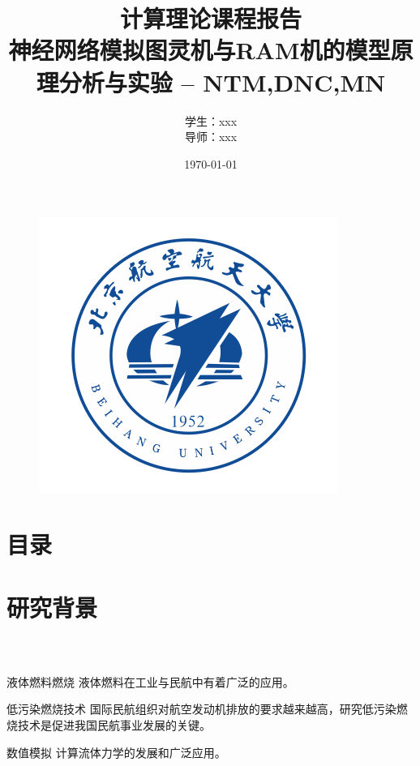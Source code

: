 \documentclass[compress]{beamer}%
\begin{document}
\graphicspath{{figures/}} %
\captionsetup[figure]{font=footnotesize,labelfont=footnotesize}

\title{计算理论课程报告 \\ 神经网络模拟图灵机与RAM机的模型原理分析与实验 -- NTM,DNC,MN }
\author[xxx]{学生：xxx\\ \vskip 5pt 导师：xxx}
\date{\small \vskip -22pt \today}
\begin{frame}
	\vspace{-10mm}
		\maketitle
	\vspace{-44mm}
	\begin{figure}[htbp]
		\begin{center}
			\includegraphics[width=0.14\linewidth]{logo}
		\end{center}
	\end{figure}
\end{frame}
\section*{目录}
\begin{frame}
	\frametitle{\secname}
	\tableofcontents[sections={<1-5>}]
\end{frame}
  



\section{研究背景}
\begin{frame}
	\frametitle{\secname~ }
	\begin{block}{液体燃料燃烧}
		液体燃料在工业与民航中有着广泛的应用。
	\end{block}
	\begin{block}{低污染燃烧技术}
		国际民航组织对航空发动机排放的要求越来越高，研究低污染燃烧技术是促进我国民航事业发展的关键。
	\end{block}
	\begin{block}{数值模拟}
		计算流体力学的发展和广泛应用。
	\end{block}
\end{frame}
\end{document}
